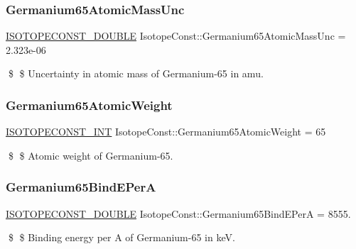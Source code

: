 \subsubsection{\texorpdfstring{Germanium65\+Atomic\+Mass\+Unc}{Germanium65AtomicMassUnc}}
{\footnotesize\ttfamily \mbox{\hyperlink{group___isotope_const-_macros_ga8f45a7272ce02c0b4c65c44636ed719a}{I\+S\+O\+T\+O\+P\+E\+C\+O\+N\+S\+T\+\_\+\+D\+O\+U\+B\+LE}} Isotope\+Const\+::\+Germanium65\+Atomic\+Mass\+Unc = 2.\+323e-\/06}

\$ \$ Uncertainty in atomic mass of Germanium-\/65 in amu. \mbox{\label{group___isotope_const-_germanium-_ge65_ga1ee8db66aaea959429894ea7b5b87a8d}} 
\subsubsection{\texorpdfstring{Germanium65\+Atomic\+Weight}{Germanium65AtomicWeight}}
{\footnotesize\ttfamily \mbox{\hyperlink{group___isotope_const-_macros_ga5f18360b3e99483a35c32d789e62621c}{I\+S\+O\+T\+O\+P\+E\+C\+O\+N\+S\+T\+\_\+\+I\+NT}} Isotope\+Const\+::\+Germanium65\+Atomic\+Weight = 65}

\$ \$ Atomic weight of Germanium-\/65. \mbox{\label{group___isotope_const-_germanium-_ge65_gacd489aef011ae49eefe313dc77036e36}} 
\subsubsection{\texorpdfstring{Germanium65\+Bind\+E\+PerA}{Germanium65BindEPerA}}
{\footnotesize\ttfamily \mbox{\hyperlink{group___isotope_const-_macros_ga8f45a7272ce02c0b4c65c44636ed719a}{I\+S\+O\+T\+O\+P\+E\+C\+O\+N\+S\+T\+\_\+\+D\+O\+U\+B\+LE}} Isotope\+Const\+::\+Germanium65\+Bind\+E\+PerA = 8555.}

\$ \$ Binding energy per A of Germanium-\/65 in keV. \mbox{\label{group___isotope_const-_germanium-_ge65_gaa14ecb8c2611afae5ba4cf605cfb3fd7}} 
